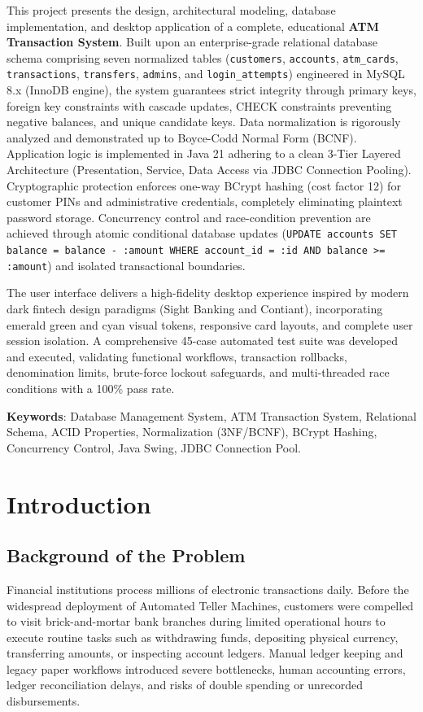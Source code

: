 \documentclass[11pt,a4paper]{report}
\begin{document}
This project presents the design, architectural modeling, database implementation, and desktop application of a complete, educational \textbf{ATM Transaction System}. Built upon an enterprise-grade relational database schema comprising seven normalized tables (\texttt{customers}, \texttt{accounts}, \texttt{atm\_cards}, \texttt{transactions}, \texttt{transfers}, \texttt{admins}, and \texttt{login\_attempts}) engineered in MySQL 8.x (InnoDB engine), the system guarantees strict integrity through primary keys, foreign key constraints with cascade updates, CHECK constraints preventing negative balances, and unique candidate keys. Data normalization is rigorously analyzed and demonstrated up to Boyce-Codd Normal Form (BCNF). Application logic is implemented in Java 21 adhering to a clean 3-Tier Layered Architecture (Presentation, Service, Data Access via JDBC Connection Pooling). Cryptographic protection enforces one-way BCrypt hashing (cost factor 12) for customer PINs and administrative credentials, completely eliminating plaintext password storage. Concurrency control and race-condition prevention are achieved through atomic conditional database updates (\texttt{UPDATE accounts SET balance = balance - :amount WHERE account\_id = :id AND balance >= :amount}) and isolated transactional boundaries. 

The user interface delivers a high-fidelity desktop experience inspired by modern dark fintech design paradigms (Sight Banking and Contiant), incorporating emerald green and cyan visual tokens, responsive card layouts, and complete user session isolation. A comprehensive 45-case automated test suite was developed and executed, validating functional workflows, transaction rollbacks, denomination limits, brute-force lockout safeguards, and multi-threaded race conditions with a 100\% pass rate.

\vspace{0.5cm}
\noindent \textbf{Keywords}: Database Management System, ATM Transaction System, Relational Schema, ACID Properties, Normalization (3NF/BCNF), BCrypt Hashing, Concurrency Control, Java Swing, JDBC Connection Pool.

\newpage

\section{Introduction}

\subsection{Background of the Problem}
Financial institutions process millions of electronic transactions daily. Before the widespread deployment of Automated Teller Machines, customers were compelled to visit brick-and-mortar bank branches during limited operational hours to execute routine tasks such as withdrawing funds, depositing physical currency, transferring amounts, or inspecting account ledgers. Manual ledger keeping and legacy paper workflows introduced severe bottlenecks, human accounting errors, ledger reconciliation delays, and risks of double spending or unrecorded disbursements.
\end{document}
